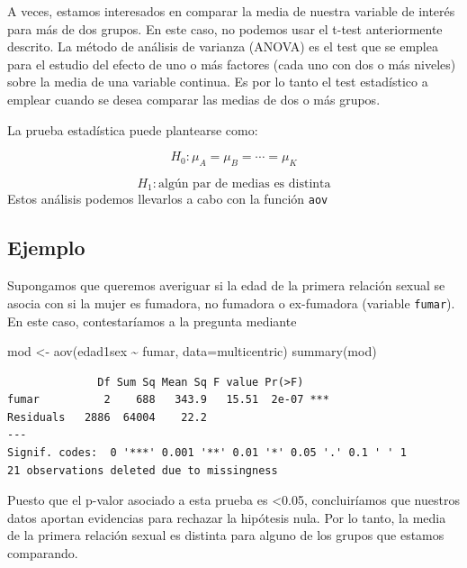 \documentclass[
]{book}
\newenvironment{Shaded}{\begin{snugshade}}{\end{snugshade}}
\newcommand{\AttributeTok}[1]{\textcolor[rgb]{0.77,0.63,0.00}{#1}}
\newcommand{\FunctionTok}[1]{\textcolor[rgb]{0.00,0.00,0.00}{#1}}
\newcommand{\NormalTok}[1]{#1}
\newcommand{\OtherTok}[1]{\textcolor[rgb]{0.56,0.35,0.01}{#1}}
\newcommand{\SpecialCharTok}[1]{\textcolor[rgb]{0.00,0.00,0.00}{#1}}
\begin{document}
A veces, estamos interesados en comparar la media de nuestra variable de interés para más de dos grupos. En este caso, no podemos usar el t-test anteriormente descrito. La método de análisis de varianza (ANOVA) es el test que se emplea para el estudio del efecto de uno o más factores (cada uno con dos o más niveles) sobre la media de una variable continua. Es por lo tanto el test estadístico a emplear cuando se desea comparar las medias de dos o más grupos.

La prueba estadística puede plantearse como:

\[H_0: \mu_A =  \mu_B = \cdots = \mu_K\]

\[H_1: \text{algún par de medias es distinta}\]
Estos análisis podemos llevarlos a cabo con la función \texttt{aov}

\hypertarget{ejemplo-4}{%
\subsection*{Ejemplo}\label{ejemplo-4}}

Supongamos que queremos averiguar si la edad de la primera relación sexual se asocia con si la mujer es fumadora, no fumadora o ex-fumadora (variable \texttt{fumar}). En este caso, contestaríamos a la pregunta mediante

\begin{Shaded}
\begin{Highlighting}[]
\NormalTok{mod }\OtherTok{\textless{}{-}} \FunctionTok{aov}\NormalTok{(edad1sex }\SpecialCharTok{\textasciitilde{}}\NormalTok{ fumar, }\AttributeTok{data=}\NormalTok{multicentric)}
\FunctionTok{summary}\NormalTok{(mod)}
\end{Highlighting}
\end{Shaded}

\begin{verbatim}
              Df Sum Sq Mean Sq F value Pr(>F)    
fumar          2    688   343.9   15.51  2e-07 ***
Residuals   2886  64004    22.2                   
---
Signif. codes:  0 '***' 0.001 '**' 0.01 '*' 0.05 '.' 0.1 ' ' 1
21 observations deleted due to missingness
\end{verbatim}

Puesto que el p-valor asociado a esta prueba es \textless0.05, concluiríamos que nuestros datos aportan evidencias para rechazar la hipótesis nula. Por lo tanto, la media de la primera relación sexual es distinta para alguno de los grupos que estamos comparando.
\end{document}
